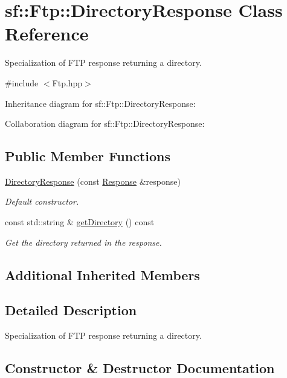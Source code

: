 \hypertarget{classsf_1_1_ftp_1_1_directory_response}{}\section{sf\+:\+:Ftp\+:\+:Directory\+Response Class Reference}
\label{classsf_1_1_ftp_1_1_directory_response}


Specialization of F\+TP response returning a directory.  




{\ttfamily \#include $<$Ftp.\+hpp$>$}



Inheritance diagram for sf\+:\+:Ftp\+:\+:Directory\+Response\+:


Collaboration diagram for sf\+:\+:Ftp\+:\+:Directory\+Response\+:
\subsection*{Public Member Functions}
\begin{DoxyCompactItemize}
\item 
\hyperlink{classsf_1_1_ftp_1_1_directory_response_a36b6d2728fa53c4ad37b7a6307f4d388}{Directory\+Response} (const \hyperlink{classsf_1_1_ftp_1_1_response}{Response} \&response)
\begin{DoxyCompactList}\small\item\em Default constructor. \end{DoxyCompactList}\item 
const std\+::string \& \hyperlink{classsf_1_1_ftp_1_1_directory_response_a311575c5c50905219025acfa73de67e2}{get\+Directory} () const
\begin{DoxyCompactList}\small\item\em Get the directory returned in the response. \end{DoxyCompactList}\end{DoxyCompactItemize}
\subsection*{Additional Inherited Members}


\subsection{Detailed Description}
Specialization of F\+TP response returning a directory. 

\subsection{Constructor \& Destructor Documentation}
\mbox{\label{classsf_1_1_ftp_1_1_directory_response_a36b6d2728fa53c4ad37b7a6307f4d388}} 
